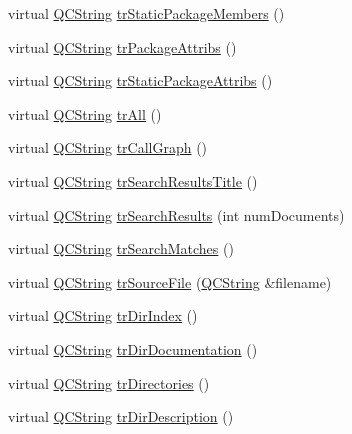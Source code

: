 \begin{DoxyCompactItemize}
\item 
virtual \mbox{\hyperlink{class_q_c_string}{Q\+C\+String}} \mbox{\hyperlink{class_translator_polish_a238343357e9b2101031e62625898b551}{tr\+Static\+Package\+Members}} ()
\item 
virtual \mbox{\hyperlink{class_q_c_string}{Q\+C\+String}} \mbox{\hyperlink{class_translator_polish_a9d93ff45e31cb1980a348b1ca153db38}{tr\+Package\+Attribs}} ()
\item 
virtual \mbox{\hyperlink{class_q_c_string}{Q\+C\+String}} \mbox{\hyperlink{class_translator_polish_a3240b7a231cbdf919ad2db0dac493482}{tr\+Static\+Package\+Attribs}} ()
\item 
virtual \mbox{\hyperlink{class_q_c_string}{Q\+C\+String}} \mbox{\hyperlink{class_translator_polish_aca3e4c90b0b73f539b35583a3724a6dd}{tr\+All}} ()
\item 
virtual \mbox{\hyperlink{class_q_c_string}{Q\+C\+String}} \mbox{\hyperlink{class_translator_polish_add5826ec6c8c24fe5e7edb8bbbc99734}{tr\+Call\+Graph}} ()
\item 
virtual \mbox{\hyperlink{class_q_c_string}{Q\+C\+String}} \mbox{\hyperlink{class_translator_polish_a1e5f630f5e2718f59c4dca3035e6c0e3}{tr\+Search\+Results\+Title}} ()
\item 
virtual \mbox{\hyperlink{class_q_c_string}{Q\+C\+String}} \mbox{\hyperlink{class_translator_polish_a50377b9dde8bdb7e761f6aefa74aeab3}{tr\+Search\+Results}} (int num\+Documents)
\item 
virtual \mbox{\hyperlink{class_q_c_string}{Q\+C\+String}} \mbox{\hyperlink{class_translator_polish_abef8d4d24996c6ab78698f8b2763d406}{tr\+Search\+Matches}} ()
\item 
virtual \mbox{\hyperlink{class_q_c_string}{Q\+C\+String}} \mbox{\hyperlink{class_translator_polish_ad83481d0c95415c183e3b9ac5420e28e}{tr\+Source\+File}} (\mbox{\hyperlink{class_q_c_string}{Q\+C\+String}} \&filename)
\item 
virtual \mbox{\hyperlink{class_q_c_string}{Q\+C\+String}} \mbox{\hyperlink{class_translator_polish_a347895b3f2a13544f01310ca7bc03a00}{tr\+Dir\+Index}} ()
\item 
virtual \mbox{\hyperlink{class_q_c_string}{Q\+C\+String}} \mbox{\hyperlink{class_translator_polish_a9f94a092939c9b385027bacc8710197f}{tr\+Dir\+Documentation}} ()
\item 
virtual \mbox{\hyperlink{class_q_c_string}{Q\+C\+String}} \mbox{\hyperlink{class_translator_polish_a38f80f778fd5f49b9a46a725b8fea137}{tr\+Directories}} ()
\item 
virtual \mbox{\hyperlink{class_q_c_string}{Q\+C\+String}} \mbox{\hyperlink{class_translator_polish_af2a02431db34db38fb46515dda127bc6}{tr\+Dir\+Description}} ()

\end{DoxyCompactItemize}
